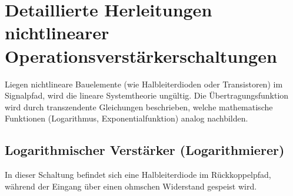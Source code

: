 \documentclass[11pt,a4paper]{article}
\begin{document}
\section{Detaillierte Herleitungen nichtlinearer Operationsverstärkerschaltungen}

Liegen nichtlineare Bauelemente (wie Halbleiterdioden oder Transistoren) im Signalpfad, wird die lineare Systemtheorie ungültig. Die Übertragungsfunktion wird durch transzendente Gleichungen beschrieben, welche mathematische Funktionen (Logarithmus, Exponentialfunktion) analog nachbilden.

\subsection{Logarithmischer Verstärker (Logarithmierer)}
In dieser Schaltung befindet sich eine Halbleiterdiode im Rückkoppelpfad, während der Eingang über einen ohmschen Widerstand gespeist wird.
\end{document}
